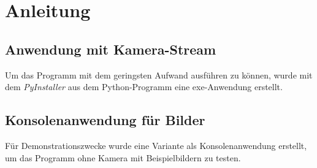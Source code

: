 
\section{Anleitung}
\label{sec:Anleitung}

\subsection{Anwendung mit Kamera-Stream}
Um das Programm mit dem geringsten Aufwand ausführen zu können, wurde mit dem \emph{PyInstaller} aus dem Python-Programm eine exe-Anwendung erstellt.

\subsection{Konsolenanwendung für Bilder}
Für Demonstrationszwecke wurde eine Variante als Konsolenanwendung erstellt, um das Programm ohne Kamera mit Beispielbildern zu testen. 

